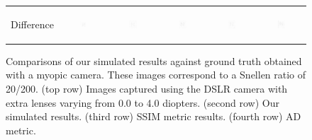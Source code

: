 \begin{figure}[!t]
\begin{tabular}{@{}r@{ } c@{ } c@{ } c@{ } c@{ } c }
	\begin{sideways} \parbox[b]{20mm} {Difference} \end{sideways} &
	\includegraphics[width=0.185\textwidth]{__Images/05/BW_N(20-200)_+0D_to_+4D/bw_N_20-200_Camera+0,00D(diff).png} &
	\includegraphics[width=0.185\textwidth]{__Images/05/BW_N(20-200)_+0D_to_+4D/bw_N_20-200_Camera+1,00D(diff).png} &
	\includegraphics[width=0.185\textwidth]{__Images/05/BW_N(20-200)_+0D_to_+4D/bw_N_20-200_Camera+2,00D(diff).png} &
	\includegraphics[width=0.185\textwidth]{__Images/05/BW_N(20-200)_+0D_to_+4D/bw_N_20-200_Camera+3,00D(diff).png} &
	\includegraphics[width=0.185\textwidth]{__Images/05/BW_N(20-200)_+0D_to_+4D/bw_N_20-200_Camera+4,00D(diff).png} \\
 
	\end{tabular}
	
	\caption[Comparisons of our simulated results against ground truth obtained with a myopic camera]{Comparisons of our simulated results against ground truth obtained with a myopic camera. These images correspond to a Snellen ratio of 20/200.   (top row) Images captured using the DSLR camera with extra lenses varying from 0.0 to 4.0 diopters. (second row) Our simulated results. (third row) SSIM metric results. (fourth row) AD metric. } %
	\label{fig:comparison_myopic_bw}
\end{figure}